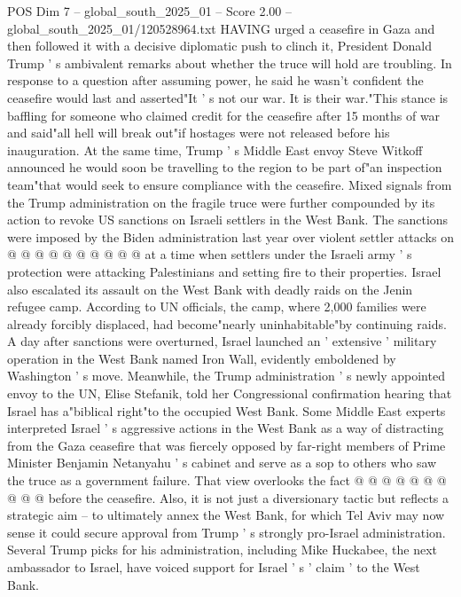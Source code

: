 \begin{textsample}{POS Dim 7 – global\_south\_2025\_01 – Score 2.00 – global\_south\_2025\_01/120528964.txt}  \label{ex:f7_pos_258}
HAVING urged a ceasefire in Gaza and then followed it with a decisive diplomatic push to clinch it, President Donald Trump ' s ambivalent remarks about whether the truce will hold are troubling.
In response to a question after assuming power, he said he wasn't confident the ceasefire would last and asserted"It ' s not our war.
It is their war."This stance is baffling for someone who claimed credit for the ceasefire after 15 months of war and said"all hell will break out"if hostages were not released before his inauguration.
At the same time, Trump ' s Middle East envoy Steve Witkoff announced he would soon be travelling to the region to be part of"an inspection team"that would seek to ensure compliance with the ceasefire.
Mixed signals from the Trump administration on the fragile truce were further compounded by its action to revoke US sanctions on Israeli settlers in the West Bank.
The sanctions were imposed by the Biden administration last year over violent settler attacks on @ @ @ @ @ @ @ @ @ @ at a time when settlers under the Israeli army ' s protection were attacking Palestinians and setting fire to their properties.
Israel also escalated its assault on the West Bank with deadly raids on the Jenin refugee camp.
According to UN officials, the camp, where 2,000 families were already forcibly displaced, had become"nearly uninhabitable"by continuing raids.
A day after sanctions were overturned, Israel launched an ' extensive ' military operation in the West Bank named Iron Wall, evidently emboldened by Washington ' s move.
Meanwhile, the Trump administration ' s newly appointed envoy to the UN, Elise Stefanik, told her Congressional confirmation hearing that Israel has a"biblical right"to the occupied West Bank.
Some Middle East experts interpreted Israel ' s aggressive actions in the West Bank as a way of distracting from the Gaza ceasefire that was fiercely opposed by far-right members of Prime Minister Benjamin Netanyahu ' s cabinet and serve as a sop to others who saw the truce as a government failure.
That view overlooks the fact @ @ @ @ @ @ @ @ @ @ before the ceasefire.
Also, it is not just a diversionary tactic but reflects a strategic aim -- to ultimately annex the West Bank, for which Tel Aviv may now sense it could secure approval from Trump ' s strongly pro-Israel administration.
Several Trump picks for his administration, including Mike Huckabee, the next ambassador to Israel, have voiced support for Israel ' s ' claim ' to the West Bank.

\end{textsample}
